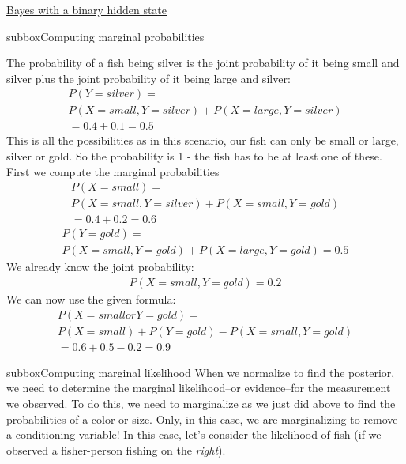 \begin{textbox}{\href{https://compneuro.neuromatch.io/tutorials/W3D1_BayesianDecisions/student/W3D1_Tutorial1.html}{Bayes with a binary hidden state } }
\begin{subbox}{subbox}{Computing marginal probabilities}
\scriptsize

 The probability of a fish being silver is the joint probability of it being
     small and silver plus the joint probability of it being large and silver:
\begin{eqnarray*}
 P(Y = silver) =\\ 
 P(X = small, Y = silver) + P(X = large, Y = silver)\\
                  = 0.4 + 0.1
                  = 0.5
                  \end{eqnarray*} 
This is all the possibilities as in this scenario, our fish can only be small
   or large, silver or gold. So the probability is 1 - the fish has to be at
   least one of these.\\
 First we compute the marginal probabilities
\begin{align*} P(X = small) =\\ P(X = small, Y = silver) + P(X = small, Y = gold)\\ = 0.4+0.2=0.6\end{align*} 
\begin{align*}  P(Y = gold) = \\P(X = small, Y = gold) + P(X = large, Y = gold) = 0.5\end{align*} 
   We already know the joint probability: \begin{align*} P(X = small, Y = gold) = 0.2\end{align*} 
   We can now use the given formula:
\begin{align*}    P( X = small or Y = gold) = \\P(X = small) + P(Y = gold) - P(X = small, Y = gold)\\
                             = 0.6 + 0.5 - 0.2
                             = 0.9 \end{align*} 
                             
                    

\end{subbox}
\begin{subbox}{subbox}{Computing marginal likelihood}
\scriptsize
When we normalize to find the posterior, we need to determine the marginal likelihood--or evidence--for the measurement we observed. To do this, we need to marginalize as we just did above to find the probabilities of a color or size. Only, in this case, we are marginalizing to remove a conditioning variable! In this case, let's consider the likelihood of fish (if we observed a fisher-person fishing on the \textit{right}).


\end{subbox}
\end{textbox}
